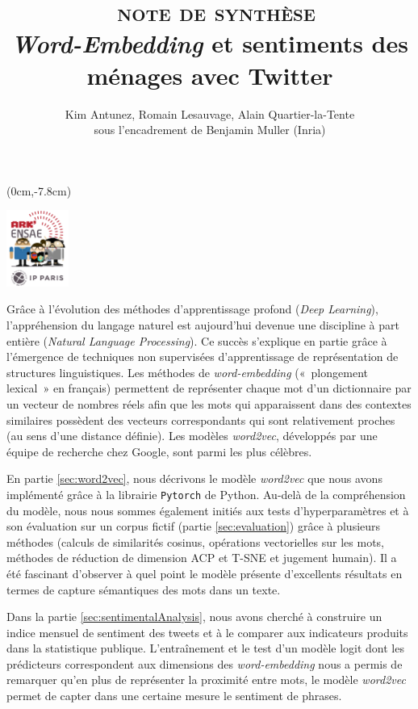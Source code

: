 \documentclass[10pt,french,french]{article}
\title{~\textsc{note de synthèse}\\
\hspace*{0.333em}\emph{Word-Embedding} et sentiments des ménages avec
Twitter}
\author{Kim Antunez, Romain Lesauvage, Alain Quartier-la-Tente\\
sous l'encadrement de Benjamin Muller (Inria)}
\date{}
\begin{document}
\maketitle


\begin{textblock*}{\textwidth}(0cm,-7.8cm)
\begin{center}
\includegraphics[height=2.5cm]{img/LOGO-ENSAE.png}
\end{center}
\end{textblock*}

Grâce à l'évolution des méthodes d'apprentissage profond (\emph{Deep
Learning}), l'appréhension du langage naturel est aujourd'hui devenue
une discipline à part entière (\emph{Natural Language Processing}). Ce
succès s'explique en partie grâce à l'émergence de techniques non
supervisées d'apprentissage de représentation de structures
linguistiques. Les méthodes de \emph{word-embedding} («~plongement
lexical~» en français) permettent de représenter chaque mot d'un
dictionnaire par un vecteur de nombres réels afin que les mots qui
apparaissent dans des contextes similaires possèdent des vecteurs
correspondants qui sont relativement proches (au sens d'une distance
définie). Les modèles \emph{word2vec}, développés par une équipe de
recherche chez Google, sont parmi les plus célèbres.

En partie \ref{sec:word2vec}, nous décrivons le modèle \emph{word2vec}
que nous avons implémenté grâce à la librairie \texttt{Pytorch} de
Python. Au-delà de la compréhension du modèle, nous nous sommes
également initiés aux tests d'hyperparamètres et à son évaluation sur un
corpus fictif (partie \ref{sec:evaluation}) grâce à plusieurs méthodes
(calculs de similarités cosinus, opérations vectorielles sur les mots,
méthodes de réduction de dimension ACP et T-SNE et jugement humain). Il
a été fascinant d'observer à quel point le modèle présente d'excellents
résultats en termes de capture sémantiques des mots dans un texte.

Dans la partie \ref{sec:sentimentalAnalysis}, nous avons cherché à
construire un indice mensuel de sentiment des tweets et à le comparer
aux indicateurs produits dans la statistique publique. L'entraînement et
le test d'un modèle logit dont les prédicteurs correspondent aux
dimensions des \emph{word-embedding} nous a permis de remarquer qu'en
plus de représenter la proximité entre mots, le modèle \emph{word2vec}
permet de capter dans une certaine mesure le sentiment de phrases.
\end{document}
